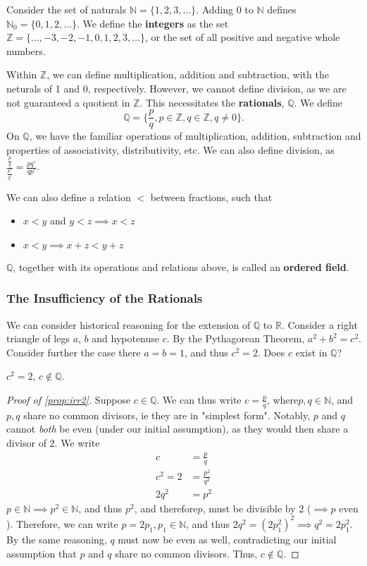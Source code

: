 \documentclass[12pt]{article}
\begin{document}
Consider the set of naturals $\mathbb{N} = \{1, 2, 3, \dots\}$. Adding $0$ to $\mathbb{N}$ defines $\mathbb{N}_0 = \{0, 1, 2, \dots\}$. We define the \textbf{integers} as the set $\mathbb{Z} = \{\dots, -3, -2, -1, 0, 1, 2, 3, \dots\}$, or the set of all positive and negative whole numbers.

Within $\mathbb{Z}$, we can define multiplication, addition and subtraction, with the neturals of 1 and 0, respectively. However, we cannot define division, as we are not guaranteed a quotient in $\mathbb{Z}$. This necessitates the \textbf{rationals}, $\mathbb{Q}$. We define \[\mathbb{Q} = \{\frac{p}{q}, p \in \mathbb{Z}, q \in \mathbb{Z}, q \neq 0\}.\]
On $\mathbb{Q}$, we have the familiar operations of multiplication, addition, subtraction and properties of associativity, distributivity, etc. We can also define division, as $\frac{\frac{p}{q}}{\frac{p'}{q'}}= \frac{pq'}{qp'}$.

We can also define a relation $<$ between fractions, such that 
\begin{itemize}
  \item $x < y$ and $y < z \implies x < z$
  \item $x < y \implies x + z < y + z$
\end{itemize}

$\mathbb{Q}$, together with its operations and relations above, is called an \textbf{ordered field}.

\subsubsection{The Insufficiency of the Rationals}

We can consider historical reasoning for the extension of $\mathbb{Q}$ to $\mathbb{R}$. Consider a right triangle of legs $a$, $b$ and hypotenuse $c$. By the Pythagorean Theorem, $a^2 + b^2 = c^2$. Consider further the case there $a = b = 1$, and thus $c^2 = 2$. Does $c$ exist in $\mathbb{Q}$?
\begin{proposition}\label{prop:irr2}
  $c^2 = 2$, $c \notin \mathbb{Q}$.
\end{proposition} 
\begin{proof}[Proof of \cref{prop:irr2}]
  Suppose $c \in \mathbb{Q}$. We can thus write $c = \frac{p}{q}$, where\footnotemark  $p, q \in \mathbb{N}$, and $p, q$ share no common divisors, ie they are in "simplest form". Notably, $p$ and $q$ cannot \emph{both} be even (under our initial assumption), as they would then share a divisor of $2$. We write \begin{align*}
    c &= \frac{p}{q}\\
    c^2 = 2 & = \frac{p^2}{q^2}\\
    2q^2 &= p^2
  \end{align*}
  $p \in \mathbb{N} \implies p^2 \in \mathbb{N}$, and thus $p^2$, and therefore\footnotemark $p$, must be divisible by 2 ($\implies p \text{ even}$). Therefore, we can write $p = 2p_1, p_1 \in \mathbb{N}$, and thus $2q^2 = (2p_1^2)^2 \implies q^2 = 2p_1^2$. By the same reasoning, $q$ must now be even as well, contradicting our initial assumption that $p$ and $q$ share no common divisors. Thus, $c \notin \mathbb{Q}$.
\end{proof}
\end{document}
